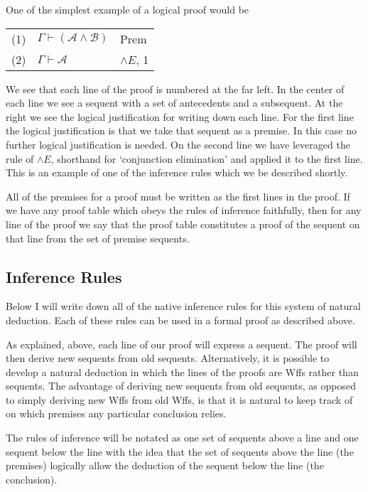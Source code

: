\documentclass[12pt]{article}
\newcommand{\mc}[1]{\mathcal{#1}}
\begin{document}
One of the simplest example of a logical proof would be

\begin{center}
\begin{tabular}{ p{1cm} p{6cm} p{2cm} }
(1) & $\Gamma \vdash (\mc{A} \land \mc{B})$ & Prem\\
(2) & $\Gamma \vdash \mc{A}$ & $\land E$, 1\\
\end{tabular}
\end{center}

We see that each line of the proof is numbered at the far left.
In the center of each line we see a sequent with a set of antecedents and a subsequent.
At the right we see the logical justification for writing down each line.
For the first line the logical justification is that we take that sequent as a premise.
In this case no further logical justification is needed.
On the second line we have leveraged the rule of $\land E$, shorthand for `conjunction elimination' and applied it to the first line.
This is an example of one of the inference rules which we be described shortly.

All of the premises for a proof must be written as the first lines in the proof.
If we have any proof table which obeys the rules of inference faithfully, then for any line of the proof we say that the proof table constitutes a proof of the sequent on that line from the set of premise sequents.

\subsection*{Inference Rules}

Below I will write down all of the native inference rules for this system of natural deduction.
Each of these rules can be used in a formal proof as described above.

As explained, above, each line of our proof will express a sequent.
The proof will then derive new sequents from old sequents.
Alternatively, it is possible to develop a natural deduction in which the lines of the proofs are Wffs rather than sequents.
The advantage of deriving new sequents from old sequents, as opposed to simply deriving new Wffs from old Wffs, is that it is natural to keep track of on which premises any particular conclusion relies.

The rules of inference will be notated as one set of sequents above a line and one sequent below the line with the idea that the set of sequents above the line (the premises) logically allow the deduction of the sequent below the line (the conclusion). 
\end{document}
